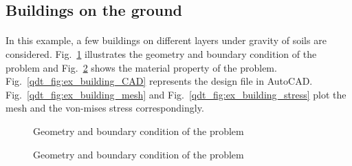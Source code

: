 \subsection{Buildings on the ground}
\paragraph{}
In this example, a few buildings on different layers under gravity of soils are considered.
Fig.~\ref{qdt_fig:ex_building_geo} illustrates the geometry and boundary condition of the problem and Fig.~\ref{qdt_fig:ex_building_mat} shows the material property of the problem.
Fig.~\ref{qdt_fig:ex_building_CAD} represents the design file in AutoCAD.
Fig.~\ref{qdt_fig:ex_building_mesh} and Fig.~\ref{qdt_fig:ex_building_stress} plot the mesh and the von-mises stress correspondingly.
\begin{figure}
    \centering
    \caption{Geometry and boundary condition of the problem}
    \label{qdt_fig:ex_building_geo}
\end{figure}

\begin{figure}
    \centering
    \caption{Geometry and boundary condition of the problem}
    \label{qdt_fig:ex_building_mat}
\end{figure}

